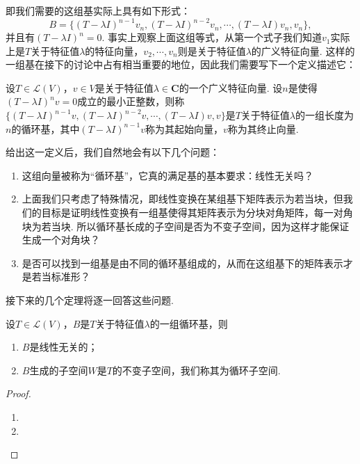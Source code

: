 即我们需要的这组基实际上具有如下形式：
\[B=\{(T-\lambda I)^{n-1}v_n,(T-\lambda I)^{n-2}v_n,\cdots,(T-\lambda I)v_n,v_n\},\]
并且有$(T-\lambda I)^n=0$. 事实上观察上面这组等式，从第一个式子我们知道$v_1$实际上是$T$关于特征值$\lambda$的特征向量，$v_2,\cdots,v_n$则是关于特征值$\lambda$的广义特征向量. 这样的一组基在接下的讨论中占有相当重要的地位，因此我们需要写下一个定义描述它：
\begin{definition} \label{def:18:循环基}
    设$T\in\mathcal{L}(V)$，$v\in V$是关于特征值$\lambda\in\mathbf{C}$的一个广义特征向量. 设$n$是使得$(T-\lambda I)^n v=0$成立的最小正整数，则称$\{(T-\lambda I)^{n-1}v,(T-\lambda I)^{n-2}v,\cdots,(T-\lambda I)v,v\}$是$T$关于特征值$\lambda$的一组长度为$n$的循环基，其中$(T-\lambda I)^{n-1}v$称为其起始向量，$v$称为其终止向量.
\end{definition}

给出这一定义后，我们自然地会有以下几个问题：
\begin{enumerate}
    \item 这组向量被称为``循环基''，它真的满足基的基本要求：线性无关吗？
    \item 上面我们只考虑了特殊情况，即线性变换在某组基下矩阵表示为若当块，但我们的目标是证明线性变换有一组基使得其矩阵表示为分块对角矩阵，每一对角块为若当块. 所以循环基长成的子空间是否为不变子空间，因为这样才能保证生成一个对角块？
    \item 是否可以找到一组基是由不同的循环基组成的，从而在这组基下的矩阵表示才是若当标准形？
\end{enumerate}

接下来的几个定理将逐一回答这些问题.
\begin{theorem}
    设$T\in\mathcal{L}(V)$，$B$是$T$关于特征值$\lambda$的一组循环基，则
    \begin{enumerate}
        \item $B$是线性无关的；
        \item $B$生成的子空间$W$是$T$的不变子空间，我们称其为循环子空间.
    \end{enumerate}
\end{theorem}
\begin{proof}
    \begin{enumerate}
        \item
        \item
    \end{enumerate}
\end{proof}

